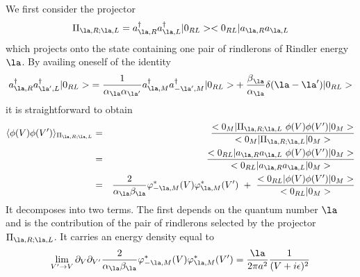 We first consider the projector
\begin{equation}
\Pi_{\la,R;\la,L} = a^\dagger_{\la,R} a^\dagger_{\la,L}
\ket{0_{RL}}\bra{0_{RL}} a_{\la,R} a_{\la,L}
\end{equation}
which projects onto the state containing one pair of
rindlerons of Rindler energy $\la$.
By availing
oneself of the identity
\begin{equation}
  a_{\la,R}^\dagger a_{\la^\prime,L}^\dagger \ket{0_{RL}} ={1 \over \al_\la
\al_{\la^\prime} } a_{\la,M}^\dagger a_{-\la^\prime,M}^\dagger
\ket{0_{RL}} + {
\be_\la \over \al_\la} \delta ( \la -
\la^\prime )\ket{0_{RL}} \end{equation}
it is
straightforward to obtain
\begin{eqnarray}
\langle \phi(V)\phi(V^\prime) \rangle_{\Pi_{\la,R;\la,L}} &=& \expect
{0_{M}}{\Pi_{\la,R;\la,L}\ \phi(V)\phi(V^\prime)}{0_M} \over  \expect
{0_{M}}{\Pi_{\la,R;\la,L}}{0_M} \nonumber\\
&=& \expect
{0_{RL}}{a_{\la,R}a_{\la,L}\ \phi(V)\phi(V^\prime)}{0_M} \over  \expect
{0_{RL}}{a_{\la,R}a_{\la,L}}{0_M} \nonumber\\ &=& {2 \over
\alpha_{\la}\beta_{\la}} \varphi_{-\la , M}^* (V)
 \varphi_{\la , M}^* (V^\prime) \ + \  {
\expect{0_{RL}}{\phi(V)\phi(V^\prime)}{0_M} \over  \scal {0_{RL}}{0_M} }
\label{threefouri} \end{eqnarray}
 It decomposes into two terms. The first depends on the quantum number $\la$
and is the contribution of the pair of rindlerons
selected by the projector $\Pi_{\la,R;\la,L}$.
It carries an energy density equal to  \begin{equation} \lim_{V^\prime
\rightarrow
V}
\partial_V \partial_{V^\prime}{2 \over \alpha_{\la}\beta_{\la}} \varphi_{-\la
, M}^* (V)
 \varphi_{\la , M}^* (V^\prime)= {\la \over 2 \pi a^2}{1 \over (V + i \e)^2}
\label{threefourii} \end{equation}

